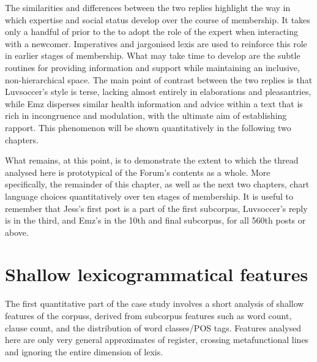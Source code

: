 

The similarities and differences between the two replies highlight the way in which expertise and social status develop over the course of membership. It takes only a handful of prior  to the  to adopt the role of the expert when interacting with a newcomer. Imperatives and jargonised lexis are used to reinforce this role in earlier stages of membership. What may take time to develop are the subtle routines for providing information and support while maintaining an inclusive, non\hyp{}hierarchical space. The main point of contrast between the two replies is that Luvsoccer's style is terse, lacking almost entirely in elaborations and pleasantries, while Emz disperses similar health information and advice within a text that is rich in incongruence and modulation, with the ultimate aim of establishing rapport. This phenomenon will be shown quantitatively in the following two chapters.

What remains, at this point, is to demonstrate the extent to which the \gls{thread} analysed here is prototypical of the \gls{Forum}'s contents as a whole. More specifically, the remainder of this chapter, as well as the next two chapters, chart language choices quantitatively over ten stages of membership. It is useful to remember that Jess's first \gls{post} is a part of the first subcorpus, Luvsoccer's reply is in the third, and Emz's in the 10th and final subcorpus, for all 560th \glspl{post} or above.

\section{Shallow lexicogrammatical features} 

The first quantitative part of the case study involves a short analysis of shallow features of the \glspl{corpus}, derived from subcorpus features such as word count, clause count, and the distribution of word classes\slash \gls{POS} tags. Features analysed here are only very general approximates of register, crossing metafunctional lines and ignoring the entire dimension of lexis.

